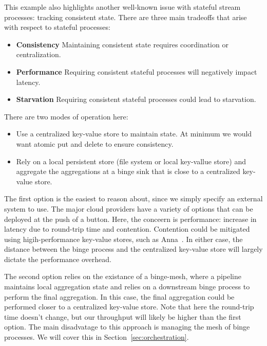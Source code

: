 \documentclass[10pt,twocolumn]{article}
\begin{document}
This example also highlights another well-known issue with stateful stream
processes: tracking consistent state.  There are three main tradeoffs that arise
with respect to stateful processes:

\begin{itemize}
\item{{\bfseries Consistency}} Maintaining consistent state requires coordination or centralization.
\item{{\bfseries Performance}} Requiring consistent stateful processes will negatively impact latency.
\item{{\bfseries Starvation}} Requiring consistent stateful processes could lead to starvation.
\end{itemize}

There are two modes of operation here:

\begin{itemize}
\item{Use a centralized key-value store to maintain state.  At minimum we would
want atomic put and delete to ensure consistency.}
\item{Rely on a local persistent store (file system or local key-vallue store)
and aggregate the aggregations at a binge sink that is close to a centralized
key-value store.}
\end{itemize}

The first option is the easiest to reason about, since we simply specify an
external system to use.  The major cloud providers have a variety of options
that can be deployed at the push of a button.  Here, the conceern is
performance: increase in latency due to round-trip time and contention.
Contention could be mitigated using higih-performance key-value stores, such as
Anna~\cite{ANNA}.  In either case, the distance between the binge process and
the centralized key-value store will largely dictate the performance overhead.

The second option relies on the existance of a binge-mesh, where a pipeline
maintains local aggregation state and relies on a downstream binge process to
perform the final aggregation.  In this case, the final aggregation could be
performed closer to a centralized key-value store.  Note that here the
round-trip time doesn't change, but our throughput will likely be higher than
the first option.  The main disadvatage to this approach is managing the mesh
of binge processes.  We will cover this in Section~\ref{sec:orchestration}.
\end{document}
